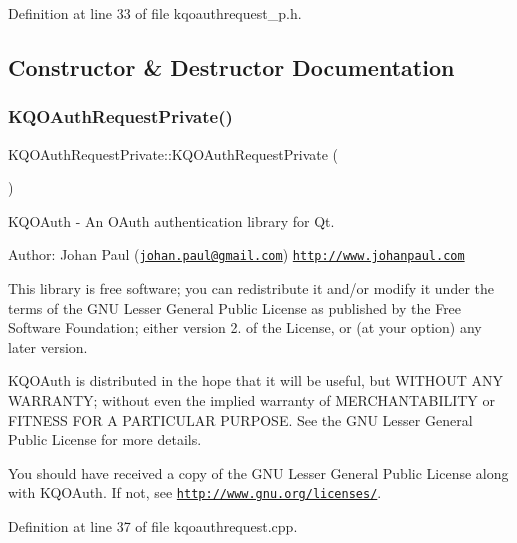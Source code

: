 Definition at line 33 of file kqoauthrequest\+\_\+p.\+h.



\subsection{Constructor \& Destructor Documentation}
\mbox{\label{class_k_q_o_auth_request_private_ad08700bda77011aa5352e02423c5b202}} 
\subsubsection{\texorpdfstring{K\+Q\+O\+Auth\+Request\+Private()}{KQOAuthRequestPrivate()}}
{\footnotesize\ttfamily K\+Q\+O\+Auth\+Request\+Private\+::\+K\+Q\+O\+Auth\+Request\+Private (\begin{DoxyParamCaption}{ }\end{DoxyParamCaption})}

K\+Q\+O\+Auth -\/ An O\+Auth authentication library for Qt.

Author\+: Johan Paul (\href{mailto:johan.paul@gmail.com}{\tt johan.\+paul@gmail.\+com}) \href{http://www.johanpaul.com}{\tt http\+://www.\+johanpaul.\+com}

This library is free software; you can redistribute it and/or modify it under the terms of the G\+NU Lesser General Public License as published by the Free Software Foundation; either version 2. of the License, or (at your option) any later version.

K\+Q\+O\+Auth is distributed in the hope that it will be useful, but W\+I\+T\+H\+O\+UT A\+NY W\+A\+R\+R\+A\+N\+TY; without even the implied warranty of M\+E\+R\+C\+H\+A\+N\+T\+A\+B\+I\+L\+I\+TY or F\+I\+T\+N\+E\+SS F\+OR A P\+A\+R\+T\+I\+C\+U\+L\+AR P\+U\+R\+P\+O\+SE. See the G\+NU Lesser General Public License for more details.

You should have received a copy of the G\+NU Lesser General Public License along with K\+Q\+O\+Auth. If not, see \href{http://www.gnu.org/licenses/}{\tt http\+://www.\+gnu.\+org/licenses/}. 

Definition at line 37 of file kqoauthrequest.\+cpp.



